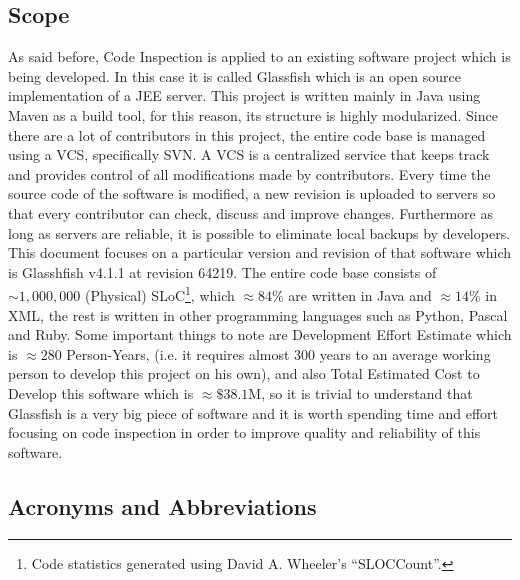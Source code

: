 \subsection{Scope}
As said before, Code Inspection is applied to an existing software project which is being developed. In this case it is called Glassfish which is an open source implementation of a JEE server.
This project is written mainly in Java using Maven as a build tool, for this reason, its structure is highly modularized. \newline
Since there are a lot of contributors in this project, the entire code base is managed using a VCS, specifically SVN. A VCS is a centralized service that keeps track and provides control of all modifications made by contributors. Every time the source code of the software is modified, a new revision is uploaded to servers so that every contributor can check, discuss and improve changes.
Furthermore as long as servers are reliable, it is possible to eliminate local backups by developers.\newline
This document focuses on a particular version and revision of that software which is Glasshfish v4.1.1 at revision 64219.
The entire code base consists of $\sim 1,000,000$ (Physical) SLoC\footnote{Code statistics generated using David A. Wheeler's ``SLOCCount''.}, which $\approx 84\%$ are written in Java and $\approx14\%$ in XML, the rest is written in other programming languages such as Python, Pascal and Ruby. Some important things to note are Development Effort Estimate which is $\approx 280$ Person-Years, (i.e. it requires almost 300 years to an average working person to develop this project on his own), and also Total Estimated Cost to Develop this software which is $\approx \$38.1$M, so it is trivial to understand that Glassfish is a very big piece of software and it is worth spending time and effort focusing on code inspection in order to improve quality and reliability of this software. 
\subsection{Acronyms and Abbreviations}
